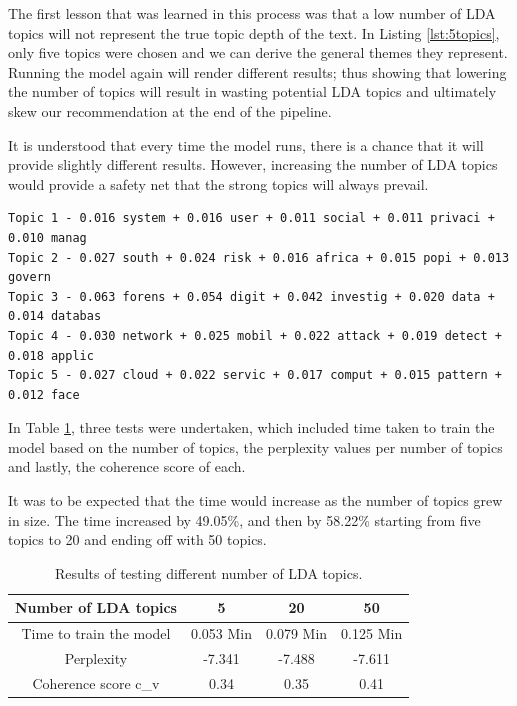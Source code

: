 The first lesson that was learned in this process was that a low number of LDA topics will not represent the true topic depth of the text. In Listing \ref{lst:5topics}, only five topics were chosen and we can derive the general themes they represent. Running the model again will render different results; thus showing that lowering the number of topics will result in wasting potential LDA topics and ultimately skew our recommendation at the end of the pipeline.

It is understood that every time the model runs, there is a chance that it will provide slightly different results. However, increasing the number of LDA topics would provide a safety net that the strong topics will always prevail.

\begin{lstlisting}[language=Text, label={lst:5topics}, caption=5 Number of topics]
Topic 1 - 0.016 system + 0.016 user + 0.011 social + 0.011 privaci + 0.010 manag
Topic 2 - 0.027 south + 0.024 risk + 0.016 africa + 0.015 popi + 0.013 govern
Topic 3 - 0.063 forens + 0.054 digit + 0.042 investig + 0.020 data + 0.014 databas
Topic 4 - 0.030 network + 0.025 mobil + 0.022 attack + 0.019 detect + 0.018 applic
Topic 5 - 0.027 cloud + 0.022 servic + 0.017 comput + 0.015 pattern + 0.012 face
\end{lstlisting}

In Table \ref{tab:numtopics}, three tests were undertaken, which included time taken to train the model based on the number of topics, the perplexity values per number of topics and lastly, the coherence score of each.

It was to be expected that the time would increase as the number of topics grew in size. The time increased by 49.05\%, and then by 58.22\% starting from five topics to 20 and ending off with 50 topics.

\begin{table}[]
\centering
\begin{tabular}{|c|c|c|c|}
\hline
\multicolumn{1}{|l|}{Number of LDA topics} & 5 & 20 & 50 \\ \hline
Time to train the model & 0.053 Min & 0.079 Min & 0.125 Min \\ \hline
Perplexity & -7.341 & -7.488 & -7.611 \\ \hline
Coherence score c\_v & 0.34 & 0.35 & 0.41 \\ \hline
\end{tabular}
\caption{Results of testing different number of LDA topics.}
\label{tab:numtopics}
\end{table}

